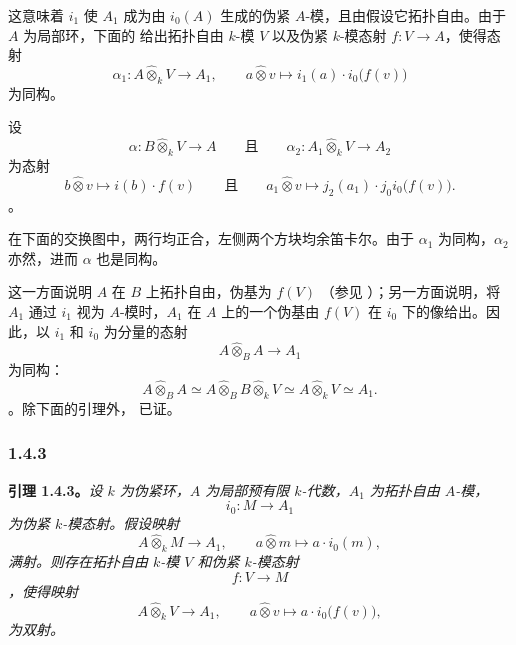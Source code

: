 \begin{samepage}这意味着 \(i_1\) 使 \(A_1\) 成为由 \(i_0(A)\) 生成的伪紧 \(A\)-模，且由假设它拓扑自由。由于 \(A\) 为局部环，下面的  给出拓扑自由 \(k\)-模 \(V\) 以及伪紧 \(k\)-模态射 \(f:V\to A\)，使得态射 \[
  \alpha_1:
  A\widehat{\otimes}_kV\longrightarrow A_1,
  \qquad
  a\widehat{\otimes}v
  \longmapsto
  i_1(a)\cdot i_0\bigl(f(v)\bigr)
\] 为同构。\end{samepage}\begin{samepage}设 \[
  \alpha:B\widehat{\otimes}_kV\longrightarrow A
  \qquad\text{且}\qquad
  \alpha_2:A_1\widehat{\otimes}_kV\longrightarrow A_2
\] 为态射 \[
  b\widehat{\otimes}v
  \longmapsto
  i(b)\cdot f(v)
  \qquad\text{且}\qquad
  a_1\widehat{\otimes}v
  \longmapsto
  j_2(a_1)\cdot j_0i_0\bigl(f(v)\bigr).
\]。\end{samepage}在下面的交换图中，两行均正合，左侧两个方块均余笛卡尔。由于 \(\alpha_1\) 为同构，\(\alpha_2\) 亦然，进而 \(\alpha\) 也是同构。\begin{center} \label{sga3:VIIB:1.4.2:alpha-cocartesian-diagram} \end{center}

这一方面说明 \(A\) 在 \(B\) 上拓扑自由，伪基为 \(f(V)\) \textup{（参见 ）}；另一方面说明，将 \(A_1\) 通过 \(i_1\) 视为 \(A\)-模时，\(A_1\) 在 \(A\) 上的一个伪基由 \(f(V)\) 在 \(i_0\) 下的像给出。因此，以 \(i_1\) 和 \(i_0\) 为分量的态射 \[
  A\widehat{\otimes}_B A\longrightarrow A_1
\] 为同构：\[
  A\widehat{\otimes}_B A
  \simeq
  A\widehat{\otimes}_B B\widehat{\otimes}_kV
  \simeq
  A\widehat{\otimes}_kV
  \simeq
  A_1.
\]。除下面的引理外， 已证。

\subsubsection*{1.4.3}
\label{sga3:VIIB:1.4.3}

\begin{samepage}\noindent\textbf{引理 1.4.3。}{\itshape 设 \(k\) 为伪紧环，\(A\) 为局部预有限 \(k\)-代数，\(A_1\) 为拓扑自由 \(A\)-模，\[
  i_0:M\longrightarrow A_1
\] 为伪紧 \(k\)-模态射。假设映射 \[
  A\widehat{\otimes}_kM\longrightarrow A_1,
  \qquad
  a\widehat{\otimes}m
  \longmapsto
  a\cdot i_0(m),
\] 满射。则存在拓扑自由 \(k\)-模 \(V\) 和伪紧 \(k\)-模态射 \[
  f:V\longrightarrow M
\]，使得映射 \[
  A\widehat{\otimes}_kV\longrightarrow A_1,
  \qquad
  a\widehat{\otimes}v
  \longmapsto
  a\cdot i_0\bigl(f(v)\bigr),
\] 为双射。}\end{samepage}

